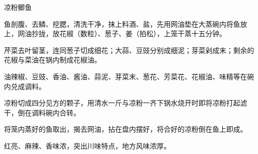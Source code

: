 \begin{recipe}{凉粉鲫鱼}

\ingredients


\preparation

\step 鱼剖腹、去鳞、挖腮，清洗干净，抹上料酒、盐，先用网油垫在大蒸碗内将鱼放
上，网油抄拢，放花椒（数粒）、葱子、姜（拍松），上笼干蒸十五分钟。

\step 芹菜去叶留茎，连同葱子切成细花；大蒜、豆豉分别成细泥；芽菜剁成末；剩余的
花椒与菜油在锅内制成花椒油。

\step 油辣椒、豆豉、香油、酱油、蒜泥、芽菜末、葱花、芳菜花、花椒油、味精等在碗
内兑成调料。

\step 凉粉切成四分见方的颗子，用清水一斤与凉粉一齐下锅水烧开时即将凉粉打起滤
干，倒在调料碗内合转。

\step 将笼内蒸好的鱼取出，揭去网油，拈在盘内摆好，将合好的凉粉倒在鱼上即成。

\features

红亮、麻辣、香味浓，突出川味特点，地方风味浓厚。

\end{recipe}

